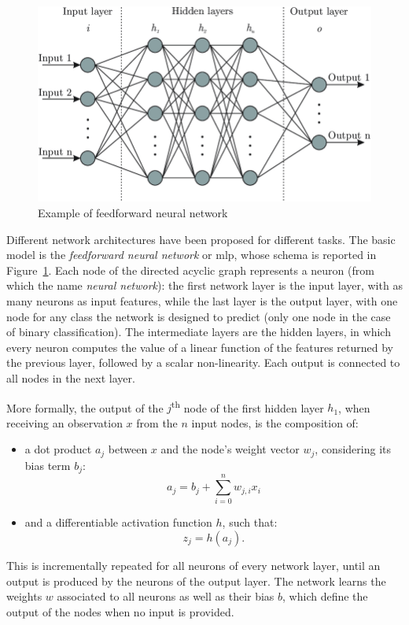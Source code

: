 \documentclass[%
    corpo=12pt,
    twoside,
    stile=classica,   
    tipotesi=magistrale,
    evenboxes,
    english,
	numerazioneromana,
]{toptesi}
\begin{document}
\begin{figure}[ht]
	\centering
	\includegraphics[width=.8\linewidth]{imgs/mlp.png}
	\caption{Example of feedforward neural network}
	\label{fig:mlp}
\end{figure}

Different network architectures have been proposed for different tasks. The basic model is the \textit{feedforward neural network} or \gls{mlp}, whose schema is reported in Figure~\ref{fig:mlp}. Each node of the directed acyclic graph represents a neuron (from which the name \textit{neural network}): the first network layer is the input layer, with as many neurons as input features, while the last layer is the output layer, with one node for any class the network is designed to predict (only one node in the case of binary classification). The intermediate layers are the hidden layers, in which every neuron computes the value of a linear function of the features returned by the previous layer, followed by a scalar non-linearity. Each output is connected to all nodes in the next layer.

\bigskip
More formally, the output of the $j$\textsuperscript{th} node of the first hidden layer $h_1$, when receiving an observation $x$ from the $n$ input nodes, is the composition of:
\begin{itemize}
	\item a dot product $a_j$ between $x$ and the node's weight vector $w_j$, considering its bias term $b_j$:
	\begin{equation*}
		a_j = b_j + \sum_{i=0}^n w_{j,i}x_i
	\end{equation*}
	\item and a differentiable activation function $h$, such that:
	\begin{equation*}
		z_j = h(a_j)\text{.}
	\end{equation*}
\end{itemize}
This is incrementally repeated for all neurons of every network layer, until an output is produced by the neurons of the output layer. The network learns the weights $w$ associated to all neurons as well as their bias $b$, which define the output of the nodes when no input is provided\cite{amini2015apprentissage}.
\end{document}
